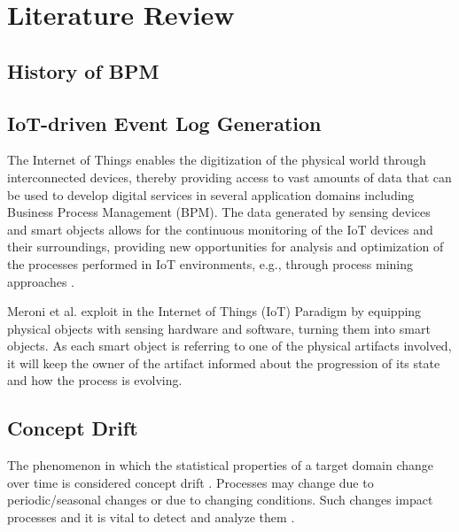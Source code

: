 \section{Literature Review}

\begin{multicols}{2}
	
\subsection{History of BPM \cite{van_der_aalst_business_2016}}



\subsection{IoT-driven Event Log Generation}
The Internet of Things enables the digitization of the physical world through interconnected devices, thereby providing access to vast amounts of data that can be used to develop digital services in several application domains including Business Process Management (BPM). The data generated by sensing devices and smart objects allows for the continuous monitoring of the IoT devices and their surroundings, providing new opportunities for analysis and optimization of the processes performed in IoT environments, e.g., through process mining approaches \cite{seiger_towards_2020}.

Meroni et al. exploit in \cite{meroni_multi-party_2018} the Internet of Things (IoT) Paradigm by equipping physical objects with sensing hardware and software, turning them into smart objects. %
As each smart object is referring to one of the physical artifacts involved, it will keep the owner of the artifact informed about the progression of its state and how the process is evolving.


\subsection{Concept Drift}
The phenomenon in which the statistical properties of a target domain change over time is considered concept drift \cite{desai_issue_2021}.
Processes may change due to periodic/seasonal changes or due to changing conditions. Such changes impact processes and it is vital to detect and analyze them \cite{van_der_aalst_conformance_2016}.


\end{multicols}
